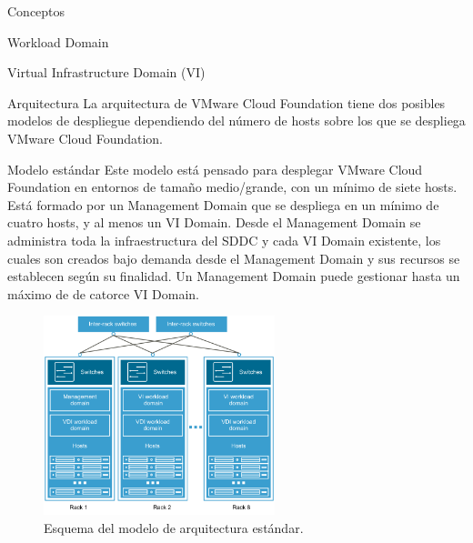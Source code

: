 \begin{section}{Conceptos}
\begin{subsection}{Workload Domain}
\begin{subsubsection}{Virtual Infrastructure Domain (VI)}
 \end{subsubsection}

\end{subsection}




\begin{subsection}{Arquitectura}
La arquitectura de VMware Cloud Foundation tiene dos posibles modelos de despliegue dependiendo del número de hosts sobre los que se despliega VMware Cloud Foundation.
\begin{subsubsection}{Modelo estándar}
Este modelo está pensado para desplegar VMware Cloud Foundation en entornos de tamaño medio/grande, con un mínimo de siete hosts. Está formado por un Management Domain que se despliega en un mínimo de cuatro hosts, y al menos un VI Domain. Desde el Management Domain se administra toda la infraestructura del SDDC y cada VI Domain existente, los cuales son creados bajo demanda desde el Management Domain y sus recursos se establecen según su finalidad. Un Management Domain puede gestionar hasta un máximo de de catorce VI Domain. 

\begin{figure}[h!]
  \centering
  \includegraphics[width=0.6\textwidth]{imaxes/conceptosPrevios/arquitect_standarCF.png}
  \caption{Esquema del modelo de arquitectura estándar.}
  \label{fig:modelostandard}
\end{figure}


\end{subsubsection}
\end{subsection}
\end{section}
